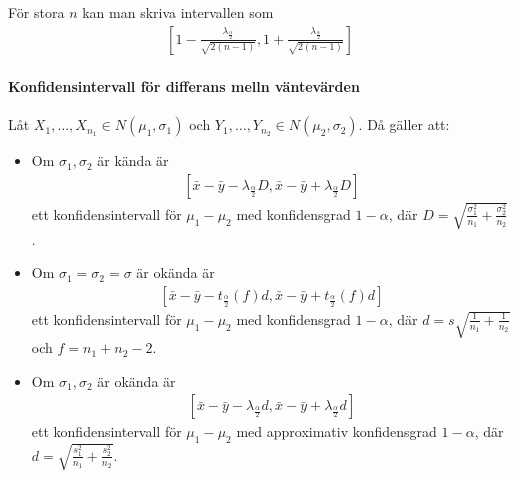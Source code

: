 För stora $n$ kan man skriva intervallen som
\begin{align*}
	\left[1 - \frac{\lambda_{\frac{\alpha}{2}}}{\sqrt{2(n - 1)}}, 1 + \frac{\lambda_{\frac{\alpha}{2}}}{\sqrt{2(n - 1)}}\right]
\end{align*}

\proof

\paragraph{Konfidensintervall för differans melln väntevärden}
Låt $X_1, \dots, X_{n_1}\in N(\mu_1, \sigma_1)$ och $Y_1, \dots, Y_{n_2}\in N(\mu_2, \sigma_2)$. Då gäller att:
\begin{itemize}
	\item Om $\sigma_1, \sigma_2$ är kända är
	\begin{align*}
		\left[\bar{x} - \bar{y} - \lambda_{\frac{\alpha}{2}}D, \bar{x} - \bar{y} + \lambda_{\frac{\alpha}{2}}D\right]
	\end{align*}
	ett konfidensintervall för $\mu_1 - \mu_2$ med konfidensgrad $1 - \alpha$, där $D = \sqrt{\frac{\sigma_1^2}{n_1} + \frac{\sigma_2^2}{n_2}}$.
	
	\item Om $\sigma_1 = \sigma_2 = \sigma$ är okända är
	\begin{align*}
		\left[\bar{x} - \bar{y} - t_{\frac{\alpha}{2}}(f)d, \bar{x} - \bar{y} + t_{\frac{\alpha}{2}}(f)d\right]
	\end{align*}
	ett konfidensintervall för $\mu_1 - \mu_2$ med konfidensgrad $1 - \alpha$, där $d = s\sqrt{\frac{1}{n_1} + \frac{1}{n_2}}$ och $f = n_1 + n_2 - 2$.
	
	\item Om $\sigma_1, \sigma_2$ är okända är
	\begin{align*}
		\left[\bar{x} - \bar{y} - \lambda_{\frac{\alpha}{2}}d, \bar{x} - \bar{y} + \lambda_{\frac{\alpha}{2}}d\right]
	\end{align*}
	ett konfidensintervall för $\mu_1 - \mu_2$ med approximativ konfidensgrad $1 - \alpha$, där $d = \sqrt{\frac{s_1^2}{n_1} + \frac{s_2^2}{n_2}}$.
\end{itemize}

\proof

